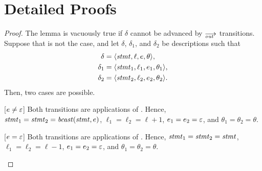 \section{Detailed Proofs}
\label{sec.appendix}


\lemxdetout*
\begin{proof}
  The lemma is vacuously true if $\delta$ cannot be advanced by $\out$
  transitions.  Suppose that is not the case, and let $\delta$, $\delta_1$,
  and $\delta_2$ be descriptions such that
  \begin{align*}
    \delta  &=\<\stmt,\ell,e,\theta>,\\
    \delta_1&=\<\stmt_1,\ell_1,e_1,\theta_1>,\\
    \delta_2&=\<\stmt_2,\ell_2,e_2,\theta_2>.
  \end{align*}
  Then, two cases are possible.
  \begin{case}
  \item[{[$e\ne\varepsilon$]}] Both transitions are applications of .
    Hence, $\mathit{stmt}_1=\mathit{stmt}_2=\mathop{\mathit{bcast}}(\mathit{stmt},e)$, $\ell_1=\ell_2=\ell+1$,
    $e_1=e_2=\varepsilon$, and $\theta_1=\theta_2=\theta$.
  \item[{[$e=\varepsilon$]}] Both transitions are applications of .  Hence,
    $\mathit{stmt}_1=\mathit{stmt}_2=\mathit{stmt}$, $\ell_1=\ell_2=\ell-1$, $e_1=e_2=\varepsilon$,
    and $\theta_1=\theta_2=\theta$.\qedhere
  \end{case}
\end{proof}

